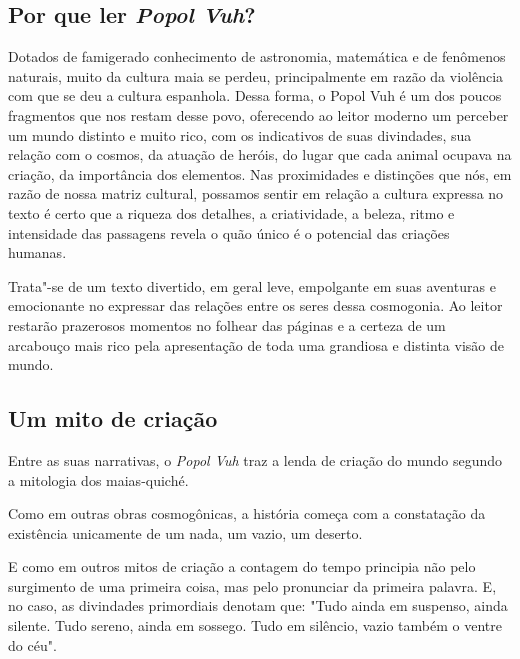\documentclass[11pt]{extarticle}
\begin{document}
 
\subsection{Por que ler \textit{Popol Vuh}?}

Dotados de famigerado conhecimento de astronomia, matemática e de
fenômenos naturais, muito da cultura maia se perdeu, principalmente em
razão da violência com que se deu a cultura espanhola. Dessa forma, o
Popol Vuh é um dos poucos fragmentos que nos restam desse povo,
oferecendo ao leitor moderno um perceber um mundo distinto e muito rico,
com os indicativos de suas divindades, sua relação com o cosmos, da
atuação de heróis, do lugar que cada animal ocupava na criação, da
importância dos elementos. Nas proximidades e distinções que nós, em
razão de nossa matriz cultural, possamos sentir em relação a cultura
expressa no texto é certo que a riqueza dos detalhes, a criatividade, a
beleza, ritmo e intensidade das passagens revela o quão único é o
potencial das criações humanas.

Trata"-se de um texto divertido, em geral leve, empolgante em suas
aventuras e emocionante no expressar das relações entre os seres dessa
cosmogonia. Ao leitor restarão prazerosos momentos no folhear das páginas
e a certeza de um arcabouço mais rico pela apresentação de toda uma
grandiosa e distinta visão de mundo.

\subsection{Um mito de criação}

Entre as suas narrativas, o \textit{Popol Vuh} traz a lenda de criação do mundo
segundo a mitologia dos maias-quiché.

Como em outras obras cosmogônicas, a história começa com a constatação
da existência unicamente de um nada, um vazio, um deserto.

E como em outros mitos de criação a contagem do tempo principia não pelo
surgimento de uma primeira coisa, mas pelo pronunciar da primeira
palavra. E, no caso, as divindades primordiais denotam que: "Tudo ainda
em suspenso, ainda silente. Tudo sereno, ainda em sossego. Tudo em
silêncio, vazio também o ventre do céu".




\end{document}
